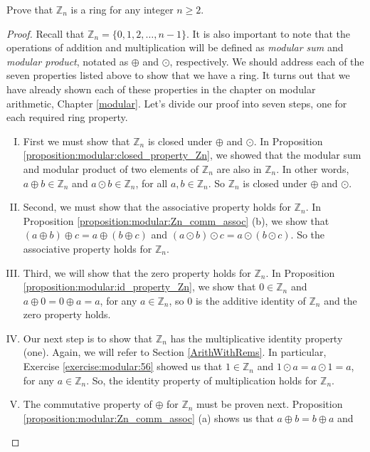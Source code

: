 \begin{example}\label{example:rings:Zn_ring}
Prove that ${\mathbb Z}_n$ is a ring for any integer $n \ge 2$.

\begin{proof}
Recall that ${\mathbb Z}_n=\{0,1,2,\ldots,n-1\}$.  It is also important to note that the operations of addition and multiplication will be defined as \emph{modular sum} and \emph{modular product}, notated as $\oplus$ and $\odot$, respectively.  We should address each of the seven properties listed above to show that we have a ring.  It turns out that we have already shown each of these properties in the chapter on modular arithmetic, Chapter \ref{modular}.  Let's divide our proof into seven steps, one for each required ring property.
\begin{enumerate}[(I)]
\item First we must show that ${\mathbb Z}_n$ is closed under $\oplus$ and $\odot$.  In Proposition \ref{proposition:modular:closed_property_Zn}, we showed that the modular sum and modular product of two elements of  ${\mathbb Z}_n$ are also in ${\mathbb Z}_n$. In other words, $a\oplus b \in{\mathbb Z}_n$ and $a\odot b\in{\mathbb Z}_n$, for all $a,b\in{\mathbb Z}_n$.  So ${\mathbb Z}_n$ is closed under $\oplus$ and $\odot$.
\item Second, we must show that the associative property holds for ${\mathbb Z}_n$.  In Proposition \ref{proposition:modular:Zn_comm_assoc} (b), we show that $(a \oplus b) \oplus c  =  a \oplus (b \oplus c)$ and $(a \odot b) \odot c    =  a \odot (b \odot c)$.  So the associative property holds for ${\mathbb Z}_n$.
\item Third, we will show that the zero property holds for ${\mathbb Z}_n$. In Proposition \ref{proposition:modular:id_property_Zn}, we show that $0 \in {\mathbb Z}_n$ and $a\oplus 0=0\oplus a=a$, for any $a\in{\mathbb Z}_n$, so $0$ is the additive identity of ${\mathbb Z}_n$ and the zero property holds.
\item Our next step is to show that ${\mathbb Z}_n$ has the multiplicative identity property (one).  Again, we will refer to Section \ref{ArithWithRems}.  In particular, Exercise \ref{exercise:modular:56} showed us that $1\in{\mathbb Z}_n$ and $1\odot a=a\odot 1=a$, for any $a\in{\mathbb Z}_n$.  So, the identity property of multiplication holds for ${\mathbb Z}_n$.
\item The commutative property of $\oplus$ for ${\mathbb Z}_n$ must be proven next.  Proposition \ref{proposition:modular:Zn_comm_assoc} (a) shows us that $a \oplus b   =  b \oplus a$ and

\end{enumerate}
\end{proof}
\end{example}
